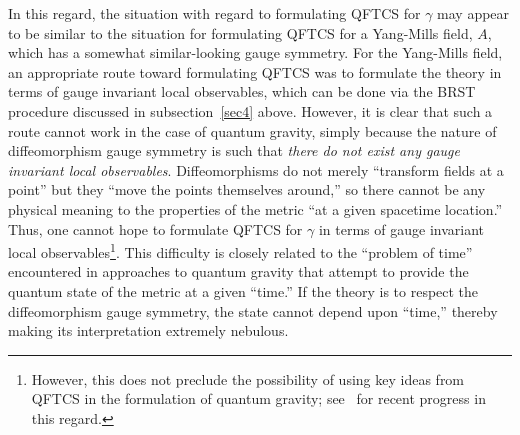 \documentclass[12pt]{article}
\theoremstyle{plain}
\theoremstyle{definition}
\begin{document}
In this regard, the situation with regard to formulating QFTCS for $\gamma$ may appear to be similar to the
situation for formulating QFTCS for a Yang-Mills field, $A$, which has a somewhat similar-looking gauge symmetry. For the Yang-Mills field, an appropriate route toward formulating QFTCS was to formulate
the theory in terms of gauge invariant local observables, which can be done via the BRST procedure discussed
in subsection~\ref{sec4} above. However, it is clear that such a route cannot work in the case of quantum gravity, simply because the nature of diffeomorphism gauge symmetry is such that {\it there do not exist any gauge invariant local observables}.
Diffeomorphisms do not merely ``transform fields at a point'' but they ``move the points themselves around,'' so there cannot be any physical meaning to the properties of the metric ``at a given spacetime location.'' Thus, one cannot
hope to formulate QFTCS for $\gamma$ in terms of gauge invariant local observables\footnote{However, this does not preclude the possibility of using key ideas from QFTCS in the formulation of quantum gravity; see~\cite{bfr} for recent progress in this regard.}. This difficulty is closely related to the ``problem of time'' encountered in approaches to quantum gravity that attempt to provide the quantum state of the metric at a given ``time.'' If the theory is to respect the diffeomorphism gauge symmetry, the state cannot depend upon
``time,'' thereby making its interpretation extremely nebulous.
\end{document}
